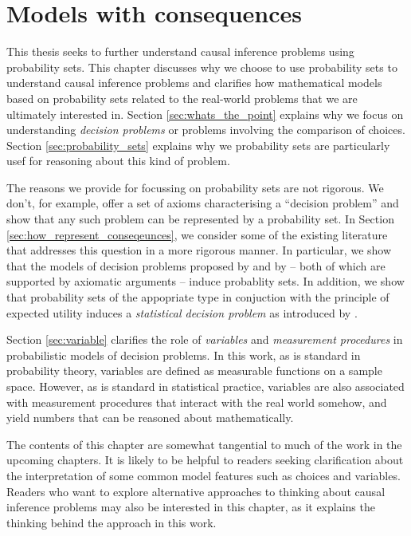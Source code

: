 

\chapter{Models with consequences}\label{ch:2p_statmodels}

This thesis seeks to further understand causal inference problems using probability sets. This chapter discusses why we choose to use probability sets to understand causal inference problems and clarifies how mathematical models based on probability sets related to the real-world problems that we are ultimately interested in. Section \ref{sec:whats_the_point} explains why we focus on understanding \emph{decision problems} or problems involving the comparison of choices. Section \ref{sec:probability_sets} explains why we probability sets are particularly usef for reasoning about this kind of problem.

The reasons we provide for focussing on probability sets are not rigorous. We don't, for example, offer a set of axioms characterising a ``decision problem'' and show that any such problem can be represented by a probability set. In Section \ref{sec:how_represent_conseqeunces}, we consider some of the existing literature that addresses this question in a more rigorous manner. In particular, we show that the models of decision problems proposed by \citet{savage_foundations_1954} and by \citet{jeffrey_logic_1990} -- both of which are supported by axiomatic arguments -- induce probablity sets. In addition, we show that probability sets of the appopriate type in conjuction with the principle of expected utility induces a \emph{statistical decision problem} as introduced by \citet{wald_statistical_1950}.

Section \ref{sec:variable} clarifies the role of \emph{variables} and \emph{measurement procedures} in probabilistic models of decision problems. In this work, as is standard in probability theory, variables are defined as measurable functions on a sample space. However, as is standard in statistical practice, variables are also associated with measurement procedures that interact with the real world somehow, and yield numbers that can be reasoned about mathematically.

The contents of this chapter are somewhat tangential to much of the work in the upcoming chapters. It is likely to be helpful to readers seeking clarification about the interpretation of some common model features such as choices and variables. Readers who want to explore alternative approaches to thinking about causal inference problems may also be interested in this chapter, as it explains the thinking behind the approach in this work.

